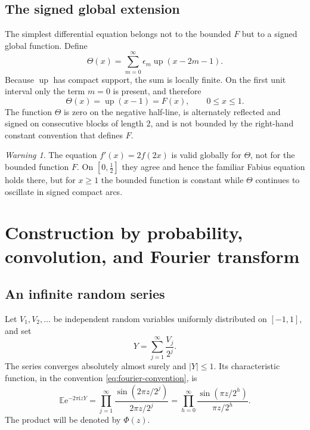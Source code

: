 \documentclass[11pt]{article}
\numberwithin{equation}{section}
\theoremstyle{definition}
\theoremstyle{remark}
\newtheorem{warning}[theorem]{Warning}
\newcommand{\e}{\mathrm{e}}
\newcommand{\ii}{\mathrm{i}}
\newcommand{\upf}{\operatorname{up}}
\newcommand{\Th}{\Theta}
\newcommand{\half}{\tfrac12}
\begin{document}
\subsection{The signed global extension}

The simplest differential equation belongs not to the bounded $F$ but to a
signed global function.  Define
\begin{equation}\label{eq:theta-def-intro}
 \Th(x)=\sum_{m=0}^{\infty}\epsilon_m\upf(x-2m-1).
\end{equation}
Because $\upf$ has compact support, the sum is locally finite.  On the first
unit interval only the term $m=0$ is present, and therefore
\begin{equation}\label{eq:theta-agrees-F}
 \Th(x)=\upf(x-1)=F(x),\qquad 0\le x\le1.
\end{equation}
The function $\Th$ is zero on the negative half-line, is alternately reflected
and signed on consecutive blocks of length $2$, and is not bounded by the
right-hand constant convention that defines $F$.

\begin{warning}
The equation $f'(x)=2f(2x)$ is valid globally for $\Th$, not for the bounded
function $F$.  On $[0,\half]$ they agree and hence the familiar Fabius
equation holds there, but for $x\ge1$ the bounded function is constant while
$\Th$ continues to oscillate in signed compact arcs.
\end{warning}

\section{Construction by probability, convolution, and Fourier transform}
\label{sec:construction}

\subsection{An infinite random series}

Let $V_1,V_2,\ldots$ be independent random variables uniformly distributed
on $[-1,1]$, and set
\begin{equation}\label{eq:Y-random-series}
 Y=\sum_{j=1}^{\infty}\frac{V_j}{2^j}.
\end{equation}
The series converges absolutely almost surely and $|Y|\le1$.  Its
characteristic function, in the convention \eqref{eq:fourier-convention}, is
\begin{equation}\label{eq:char-product}
 \mathbb E\e^{-2\pi\ii zY}
 =\prod_{j=1}^{\infty}
   \frac{\sin(2\pi z/2^j)}{2\pi z/2^j}
 =\prod_{h=0}^{\infty}\frac{\sin(\pi z/2^h)}{\pi z/2^h}.
\end{equation}
The product will be denoted by $\Phi(z)$.
\end{document}
